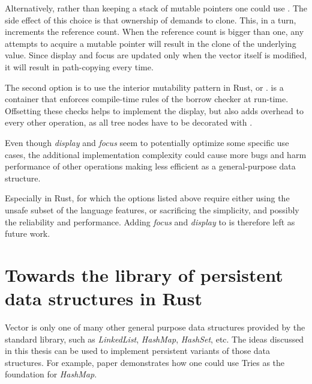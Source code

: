 Alternatively, rather than keeping a stack of mutable pointers one could use \rc{}. The side effect of this choice is that ownership of \rc{} demands to clone. This, in a turn, increments the reference count. When the reference count is bigger than one, any attempts to acquire a mutable pointer will result in the clone of the underlying value. Since display and focus are updated only when the vector itself is modified, it will result in path-copying every time.

The second option is to use the interior mutability pattern in Rust, or .  is a container that enforces compile-time rules of the borrow checker at run-time. Offsetting these checks helps to implement the display, but also adds overhead to every other operation, as all tree nodes have to be decorated with .  

Even though \emph{display} and \emph{focus} seem to potentially optimize some specific use cases, the additional implementation complexity could cause more bugs and harm performance of other operations making \rrbtree{} less efficient as a general-purpose data structure. 

Especially in Rust, for which the options listed above require either using the unsafe subset of the language features, or sacrificing the simplicity, and possibly the reliability and performance. Adding \emph{focus} and \emph{display} to \rrbvec{} is therefore left as future work.

\section{Towards the library of persistent data structures in Rust}

Vector is only one of many other general purpose data structures provided by the standard library, such as \emph{LinkedList}, \emph{HashMap}, \emph{HashSet}, etc. The ideas discussed in this thesis can be used to implement persistent variants of those data structures. For example,  paper demonstrates how one could use Tries as the foundation for \emph{HashMap}. 

